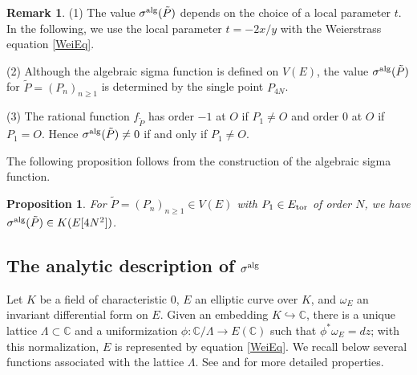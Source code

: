 \documentclass[11pt]{amsart}
\newtheorem{prop}[thm]{Proposition}
\theoremstyle{definition}
\newtheorem{rmk}[thm]{Remark}
\newcommand{\C}{\mathbb{C}}
\begin{document}
\begin{rmk}\label{rmk algsigma}
(1) The value $\sigma^{\rm alg}(\tilde{P})$ depends on the choice of a local parameter $t$. In the following, we use the local parameter $t=-2x/y$ with the Weierstrass equation \eqref{WeiEq}.

(2) Although the algebraic sigma function is defined on $V(E)$, the value $\sigma^{\rm alg}(\tilde{P})$ for $\tilde{P}=(P_n)_{n \geq 1}$ is determined by the single point $P_{4N}$.

(3) The rational function $f_{\tilde{P}}$ has order $-1$ at $O$ if $P_1 \neq O$ and order 0 at $O$ if $P_1=O$. Hence $\sigma^{\rm alg}(\tilde{P}) \neq 0$ if and only if $P_1 \neq O$.
\end{rmk}


The following proposition follows from the construction of the algebraic sigma function.

\begin{prop}\label{definition field}
For $\tilde{P}=(P_n)_{n \geq 1} \in V(E)$ with $P_1 \in E_{\rm tor}$ of order $N$, we have $\sigma^{\rm alg}(\tilde{P}) \in K(E[4N^2])$.
\end{prop}


\subsection{The analytic description of $\sigma^{\rm alg}$}

Let $K$ be a field of characteristic $0$, $E$ an elliptic curve over $K$, and $\omega_E$ an invariant differential form on $E$. Given an embedding $K \hookrightarrow \C$, there is a unique lattice $\Lambda \subset \C$ and a uniformization $\phi : \C/\Lambda \rightarrow E(\C)$ such that $\phi^{\ast}\omega_E=dz$; with this normalization, $E$ is represented by equation \eqref{WeiEq}.
We recall below several functions associated with the lattice  $\Lambda$. See {\cite[VI \S 3]{AEC}} and {\cite[I \S 5]{ATAEC}} for more detailed properties.
\end{document}
